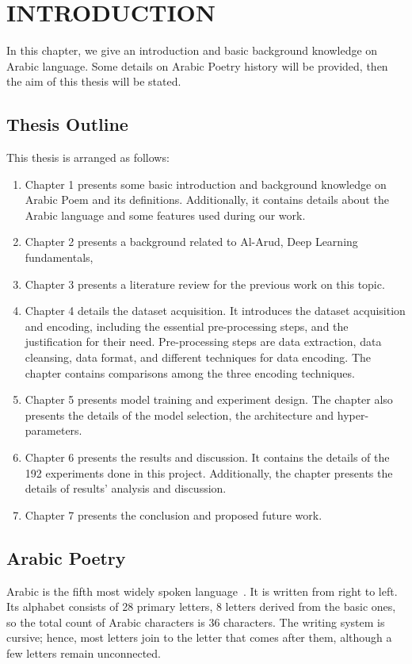 \chapter{\uppercase{Introduction}}\label{Ch:Intro}
In this chapter, we give an introduction and basic background knowledge on Arabic language. Some details on Arabic Poetry history will be provided, then the aim of this thesis will be stated.

\section{Thesis Outline}
This thesis is arranged as follows:
\begin{enumerate}
	\item Chapter 1 presents some basic introduction and background knowledge on Arabic Poem and its definitions. Additionally, it contains details about the Arabic language and some features used during our work.
	\item Chapter 2 presents a background related to Al-Arud, Deep Learning fundamentals,
	\item Chapter 3 presents a literature review for the previous work on this topic.
	\item Chapter 4 details the dataset acquisition. It introduces the
	dataset acquisition and encoding, including the essential pre-processing steps, and the
	justification for their need. Pre-processing steps are data extraction, data cleansing, data
	format, and different techniques for data encoding. The chapter contains comparisons among the
	three encoding techniques. 
	\item Chapter 5 presents model training and experiment design. The chapter also presents the details of the model selection, the architecture and hyper-parameters.
	\item Chapter 6 presents the results and discussion. It contains the details of the 192 experiments done in this project. Additionally, the chapter presents the details of results’ analysis and discussion.
	\item Chapter 7 presents the conclusion and proposed future work.
\end{enumerate}



\section{Arabic Poetry } %
Arabic is the fifth most widely spoken language~\cite{Ethnologue_2017}. It is written from right to left. Its alphabet consists of 28 primary letters, 8 letters derived from the basic ones, so the total count of Arabic characters is 36 characters. The writing system is cursive; hence, most letters join to the letter that comes after them, although a few letters remain unconnected.


